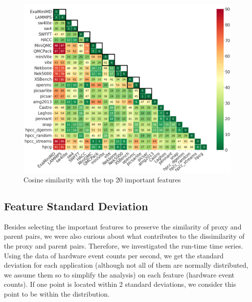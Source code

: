 \begin{figure}[ht]
\centering
\includegraphics[width=\linewidth]{figs/top20cosine_origin_color_font20.png}
\caption{Cosine similarity with the top 20 important features}
\label{figs:top20Cosine}
\end{figure}

\subsection{Feature Standard Deviation}
\label{sec:Dev}
Besides selecting the important features to preserve the similarity of proxy and parent pairs, we were also curious about what contributes to the dissimilarity of the proxy and parent pairs. Therefore, we investigated the run-time time series. Using the data of hardware event counts per second, we get the standard deviation for each application (although not all of them are normally distributed, we assume them so to simplify the analysis) on each feature (hardware event counts). If one point is located within 2 standard deviations, we consider this point to be within the distribution.


